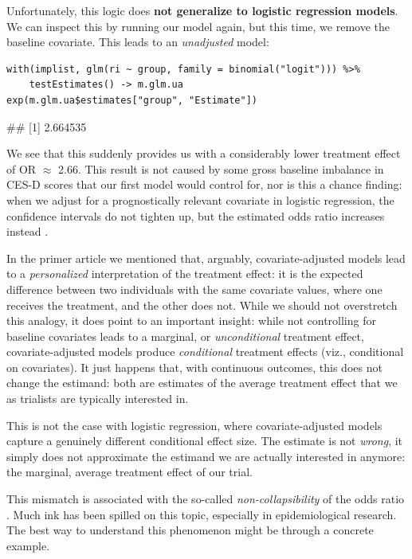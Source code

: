 Unfortunately, this logic does \textbf{not generalize to logistic regression models}. We can inspect this by running our model again, but this time, we remove the baseline covariate. This leads to an \emph{unadjusted} model:

\begin{lstlisting}
with(implist, glm(ri ~ group, family = binomial("logit"))) %>% 
    testEstimates() -> m.glm.ua
exp(m.glm.ua$estimates["group", "Estimate"])
\end{lstlisting}

\begin{example}
## [1] 2.664535
\end{example}

We see that this suddenly provides us with a considerably lower treatment effect of OR $\approx$ 2.66. This result is not caused by some gross baseline imbalance in CES-D scores that our first model would control for, nor is this a chance finding: when we adjust for a prognostically relevant covariate in logistic regression, the confidence intervals do not tighten up, but the estimated odds ratio increases instead \citep{jiang2017covariate, groenwold2011reporting}. 

In the primer article we mentioned that, arguably, covariate-adjusted models lead to a \emph{personalized} interpretation of the treatment effect: it is the expected difference between two individuals with the same covariate values, where one receives the treatment, and the other does not. While we should not overstretch this analogy, it does point to an important insight: while not controlling for baseline covariates leads to a marginal, or \emph{unconditional} treatment effect, covariate-adjusted models produce \emph{conditional} treatment effects (viz., conditional on covariates). It just happens that, with continuous outcomes, this does not change the estimand: both are estimates of the average treatment effect that we as trialists are typically interested in. 

This is not the case with logistic regression, where covariate-adjusted models capture a genuinely different conditional effect size. The estimate is not \emph{wrong}, it simply does not approximate the estimand we are actually interested in anymore: the marginal, average treatment effect of our trial.

This mismatch is associated with the so-called \emph{non-collapsibility} of the odds ratio \citep{groenwold2011reporting, daniel2021making, morris2022planning}. Much ink has been spilled on this topic, especially in epidemiological research. The best way to understand this phenomenon might be through a concrete example. 


